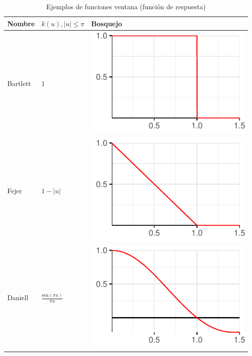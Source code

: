 \documentclass[12pt,letterpaper]{book}
\newcommand{\SEN}[1]{\mathrm{sen}\left( #1 \right)}
\newcommand{\abso}[1]{\left| #1 \right|}
\begin{document}
\begin{table}
\caption{Ejemplos de funciones ventana (función de respuesta)}
\centering
\begin{small}
\begin{tabular}{lll}
\toprule
Nombre & $k(u), \abso{u} \leq \pi$ & Bosquejo \\
\midrule
Bartlett &
$\displaystyle 
1 
$
& \includegraphics[scale=.4]{./img_ventanas/ventana_bartlett.pdf}\\
\rowcolor{gris}
Fejer &
$\displaystyle 
1-\abso{u}
$
& \includegraphics[scale=.4]{./img_ventanas/ventana_fejer.pdf} \\
Daniell &
$\displaystyle 
\frac{\SEN{\pi u}}{\pi u}
$
& \includegraphics[scale=.4]{./img_ventanas/ventana_daniell.pdf} \\

\end{tabular}
\end{small}
\end{table}
\end{document}
